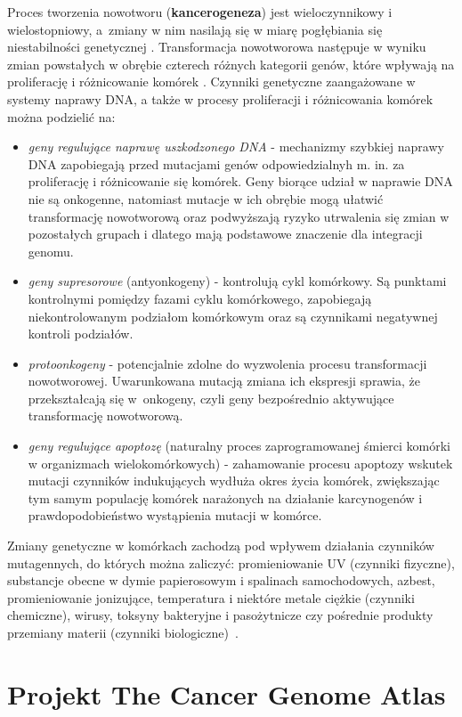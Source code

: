 Proces tworzenia nowotworu (\textbf{kancerogeneza}) jest wieloczynnikowy i wielostopniowy, a~zmiany w nim nasilają się w miarę pogłębiania się niestabilności genetycznej \cite{zikula2}. Transformacja nowotworowa następuje w wyniku zmian powstałych w obrębie czterech różnych kategorii genów, które wpływają na proliferację i różnicowanie komórek \cite{zikula}. Czynniki genetyczne zaangażowane w systemy naprawy DNA, a także w procesy proliferacji i różnicowania komórek \cite{zikula4} można podzielić na:  
\begin{itemize}
\item \textit{geny regulujące naprawę uszkodzonego DNA} - mechanizmy szybkiej naprawy DNA zapobiegają przed mutacjami genów odpowiedzialnyh m. in. za proliferację i różnicowanie się komórek. Geny biorące udział w naprawie DNA nie są onkogenne, natomiast mutacje w ich obrębie mogą ułatwić transformację nowotworową oraz podwyższają ryzyko utrwalenia się zmian w pozostałych grupach i dlatego mają podstawowe znaczenie dla integracji genomu.
\item \textit{geny supresorowe} (antyonkogeny) - kontrolują cykl komórkowy. Są punktami kontrolnymi pomiędzy fazami cyklu komórkowego, zapobiegają niekontrolowanym podziałom komórkowym oraz są czynnikami negatywnej kontroli podziałów.
\item \textit{protoonkogeny} - potencjalnie zdolne do wyzwolenia procesu transformacji nowotworowej. Uwarunkowana mutacją zmiana ich ekspresji sprawia, że przekształcają się w~onkogeny, czyli geny bezpośrednio aktywujące transformację nowotworową.
\item \textit{geny regulujące apoptozę} (naturalny proces zaprogramowanej śmierci komórki w organizmach wielokomórkowych) - zahamowanie procesu apoptozy wskutek mutacji czynników indukujących wydłuża okres życia komórek, zwiększając tym samym populację komórek narażonych na działanie karcynogenów i prawdopodobieństwo wystąpienia mutacji w komórce.
\end{itemize}
Zmiany genetyczne w komórkach zachodzą pod wpływem działania czynników mutagennych, do których można zaliczyć: promieniowanie UV (czynniki fizyczne), substancje obecne w dymie papierosowym i spalinach samochodowych, azbest, promieniowanie jonizujące, temperatura i niektóre metale ciężkie (czynniki chemiczne), wirusy, toksyny bakteryjne i pasożytnicze czy pośrednie produkty przemiany materii (czynniki biologiczne)~\cite{zikula3}.


\section{Projekt The Cancer Genome Atlas}\label{chan:TCGA}

